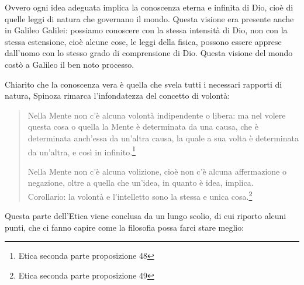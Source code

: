 Ovvero ogni idea adeguata implica la conoscenza eterna e infinita di Dio, cioè di quelle leggi di natura che governano il mondo. Questa visione era presente anche in Galileo Galilei: possiamo conoscere con la stessa intensità di Dio, non con la stessa estensione, cioè alcune cose, le leggi della fisica, possono essere apprese dall'uomo con lo stesso grado di comprensione di Dio. Questa visione del mondo costò a Galileo il ben noto processo.

Chiarito che la conoscenza vera è quella che svela tutti i necessari rapporti di natura, Spinoza rimarca l'infondatezza del concetto di volontà:

\begin{quotation}
	\small Nella Mente non c’è alcuna volontà indipendente o libera: ma nel volere questa cosa o
	quella la Mente è determinata da una causa, che è determinata anch’essa da un’altra causa,
	la quale a sua volta è determinata da un’altra, e così in infinito.\footnote{Etica seconda parte proposizione 48}
	
	\small Nella Mente non c’è alcuna volizione, cioè non c’è alcuna affermazione o negazione, oltre
	a quella che un’idea, in quanto è idea, implica.\\Corollario: la volontà e l’intelletto sono la stessa e unica cosa.\footnote{Etica seconda parte proposizione 49}
\end{quotation}

Questa parte dell'Etica viene conclusa da un lungo scolio, di cui riporto alcuni punti, che ci fanno capire come la filosofia possa farci stare meglio:

